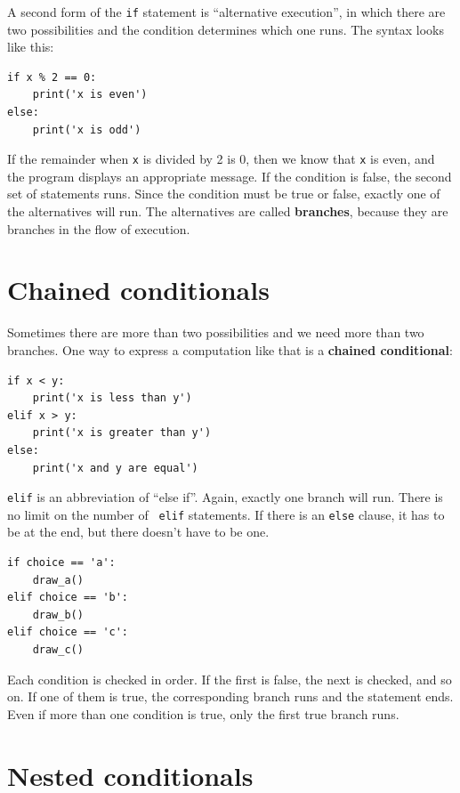 \documentclass[10pt]{book}
\begin{document}
A second form of the {\tt if} statement is ``alternative execution'',
in which there are two possibilities and the condition determines
which one runs.  The syntax looks like this:

\begin{verbatim}
if x % 2 == 0:
    print('x is even')
else:
    print('x is odd')
\end{verbatim}
%
If the remainder when {\tt x} is divided by 2 is 0, then we know that
{\tt x} is even, and the program displays an appropriate message.  If
the condition is false, the second set of statements runs.
Since the condition must be true or false, exactly one of the
alternatives will run.  The alternatives are called {\bf
  branches}, because they are branches in the flow of execution.



\section{Chained conditionals}

Sometimes there are more than two possibilities and we need more than
two branches.  One way to express a computation like that is a {\bf
chained conditional}:

\begin{verbatim}
if x < y:
    print('x is less than y')
elif x > y:
    print('x is greater than y')
else:
    print('x and y are equal')
\end{verbatim}
%
{\tt elif} is an abbreviation of ``else if''.  Again, exactly one
branch will run.  There is no limit on the number of {\tt
elif} statements.  If there is an {\tt else} clause, it has to be
at the end, but there doesn't have to be one.

\begin{verbatim}
if choice == 'a':
    draw_a()
elif choice == 'b':
    draw_b()
elif choice == 'c':
    draw_c()
\end{verbatim}
%
Each condition is checked in order.  If the first is false,
the next is checked, and so on.  If one of them is
true, the corresponding branch runs and the statement
ends.  Even if more than one condition is true, only the
first true branch runs.


\section{Nested conditionals}
\end{document}
